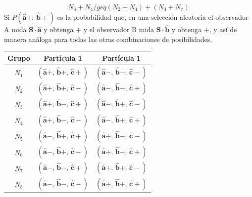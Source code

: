 \documentclass[a4paper]{article}
\begin{document}
\begin{equation}
N_3 + N_4 /geq (N_2 +  N_4) + (N_3 +  N_7)
\end{equation} 
Si $P(\mathbf{\hat{a}}+;\,\mathbf{\hat{b}}+)$ es la probabilidad que, en una selección aleatoria el observador A mida $\mathbf{S}\cdot \mathbf{\hat{a}}$ y obtenga $+$ y el observador B mida $\mathbf{S}\cdot \mathbf{\hat{b}}$ y obtenga $+$, y así de manera análoga para todas las otras combinaciones de posibilidades.
\begin{table}
\centering
\begin{tabular}{|c|c|c|}
\hline
\toprule
\textbf{Grupo} & \textbf{Partícula 1} & \textbf{Partícula 1} \\
\midrule
$N_1$ & $(\mathbf{\hat{a}}+,\, \mathbf{\hat{b}}+,\,\mathbf{\hat{c}}+)$ & $(\mathbf{\hat{a}}-,\, \mathbf{\hat{b}}-,\,\mathbf{\hat{c}}-)$\\
$N_2$ & $(\mathbf{\hat{a}}+,\, \mathbf{\hat{b}}+,\,\mathbf{\hat{c}}-)$ & $(\mathbf{\hat{a}}-,\, \mathbf{\hat{b}}-,\,\mathbf{\hat{c}}+)$\\
$N_3$ & $(\mathbf{\hat{a}}+,\, \mathbf{\hat{b}}-,\,\mathbf{\hat{c}}+)$ & $(\mathbf{\hat{a}}-,\, \mathbf{\hat{b}}+,\,\mathbf{\hat{c}}-)$\\
$N_4$ & $(\mathbf{\hat{a}}+,\, \mathbf{\hat{b}}-,\,\mathbf{\hat{c}}-)$ & $(\mathbf{\hat{a}}-,\, \mathbf{\hat{b}}+,\,\mathbf{\hat{c}}+)$\\
$N_5$ & $(\mathbf{\hat{a}}-,\, \mathbf{\hat{b}}+,\,\mathbf{\hat{c}}+)$ & $(\mathbf{\hat{a}}+,\, \mathbf{\hat{b}}-,\,\mathbf{\hat{c}}-)$\\
$N_6$ & $(\mathbf{\hat{a}}-,\, \mathbf{\hat{b}}+,\,\mathbf{\hat{c}}-)$ & $(\mathbf{\hat{a}}+,\, \mathbf{\hat{b}}-,\,\mathbf{\hat{c}}+)$\\
$N_7$ & $(\mathbf{\hat{a}}-,\, \mathbf{\hat{b}}-,\,\mathbf{\hat{c}}+)$ & $(\mathbf{\hat{a}}+,\, \mathbf{\hat{b}}+,\,\mathbf{\hat{c}}-)$\\
$N_8$ & $(\mathbf{\hat{a}}-,\, \mathbf{\hat{b}}-,\,\mathbf{\hat{c}}-)$ & $(\mathbf{\hat{a}}+,\, \mathbf{\hat{b}}+,\,\mathbf{\hat{c}}+)$\\
\bottomrule
\hline
\end{tabular}
    \label{tab:three_direction_correlations}
\end{table}
\end{document}
